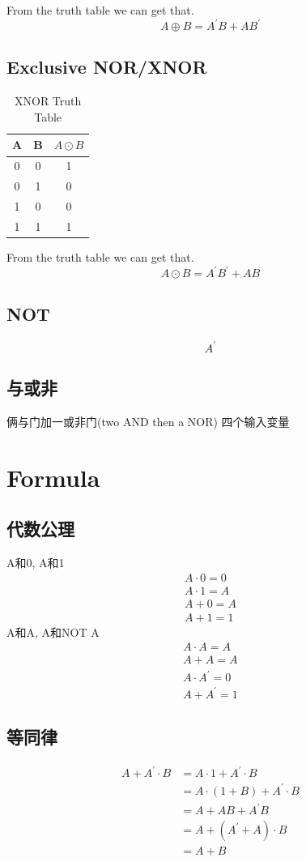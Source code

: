 \documentclass[scheme=chinese,a4paper]{report}
\begin{document}
From the truth table we can get that. 
$$A \oplus B=A^\prime B+AB^\prime$$

\subsection{Exclusive NOR/XNOR}
\begin{table}[htb]
    \centering
    \begin{tabular}{c c c}
    A&B&$A\odot B$\\
    \hline
    0&0&1\\
    0&1&0\\
    1&0&0\\
    1&1&1\\
    \end{tabular}
    \caption{XNOR Truth Table}
\end{table}

From the truth table we can get that. 
$$A \odot B=A^\prime B^\prime+AB$$

\subsection{NOT}
$$A^\prime$$
\subsection{与或非}
俩与门加一或非门(two AND then a NOR)
四个输入变量
\section{Formula}
\subsection{代数公理}
A和0, A和1
\begin{align*}
    A\cdot 0=0\\
    A\cdot 1=A\\
    A+0=A\\
    A+1=1
\end{align*}
A和A, A和NOT A
\begin{align*}
A\cdot A=A\\
A +A=A\\
A\cdot A^\prime=0\\
A+A^\prime=1
\end{align*}
\subsection{等同律}
\begin{align*}
    A+A^\prime\cdot B &= A\cdot 1+A^\prime\cdot B\\
    &=A\cdot(1+B)+A^\prime\cdot B\\
    &=A+AB+A^\prime B\\
    &=A+(A^\prime+A)\cdot B\\
    &=A+B
\end{align*}
\end{document}
